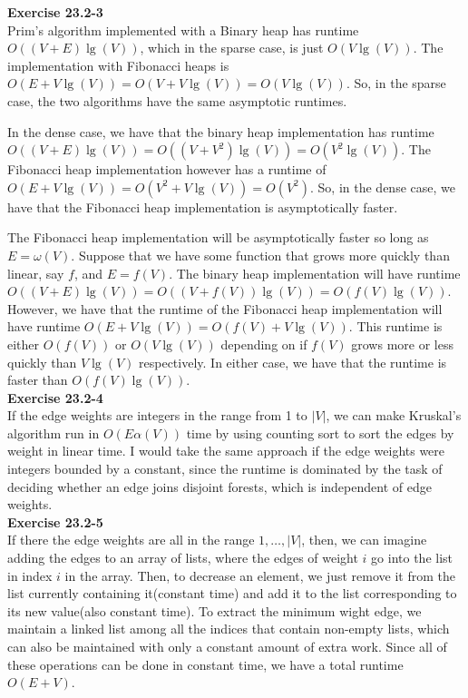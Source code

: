 \documentclass{article}
\begin{document}
\noindent\textbf{Exercise 23.2-3}\\

Prim's algorithm implemented with a Binary heap has runtime $O((V+E)\lg(V))$, which in the sparse case, is just $O(V\lg(V))$. The implementation with Fibonacci heaps is $O(E+V\lg(V)) = O(V+ V\lg(V)) = O(V\lg(V))$. So, in the sparse case, the two algorithms have the same asymptotic runtimes.

In the dense case, we have that the binary heap implementation has runtime $O((V+E)\lg(V)) = O((V+V^2)\lg(V)) = O(V^2\lg(V))$. The Fibonacci heap implementation however has a runtime of $O(E + V\lg(V)) = O(V^2 + V\lg(V)) = O(V^2)$. So, in the dense case, we have that the Fibonacci heap implementation is asymptotically faster.

The Fibonacci heap implementation will be asymptotically faster so long as $E = \omega(V)$. Suppose that we have some function that grows more quickly than linear, say $f$, and $E = f(V)$. The binary heap implementation will have runtime $O((V+E)\lg(V)) = O((V+f(V))\lg(V)) = O(f(V)\lg(V))$. However, we have that the runtime of the Fibonacci heap implementation will have runtime $O(E+ V\lg(V)) = O(f(V) + V\lg(V))$. This runtime is either $O(f(V))$ or $O(V\lg(V))$ depending on if $f(V)$ grows more or less quickly than $V\lg(V)$ respectively. In either case, we have that the runtime is faster than $O(f(V)\lg(V))$.\\

\noindent\textbf{Exercise 23.2-4}\\

If the edge weights are integers in the range from 1 to $|V|$, we can make Kruskal's algorithm run in $O(E\alpha(V))$ time by using counting sort to sort the edges by weight in linear time.  I would take the same approach if the edge weights were integers bounded by a constant, since the runtime is dominated by the task of deciding whether an edge joins disjoint forests, which is independent of edge weights. \\

\noindent\textbf{Exercise 23.2-5}\\

If there the edge weights are all in the range $1,\ldots, |V|$, then, we can imagine adding the edges to an array of lists, where the edges of weight $i$ go into the list in index $i$ in the array. Then, to decrease an element, we just remove it from the list currently containing it(constant time) and add it to the list corresponding to its new value(also constant time). To extract the minimum wight edge, we maintain a linked list among all the indices that contain non-empty lists, which can also be maintained with only a constant amount of extra work. Since all of these operations can be done in constant time, we have a total runtime $O(E+V)$.
\end{document}
